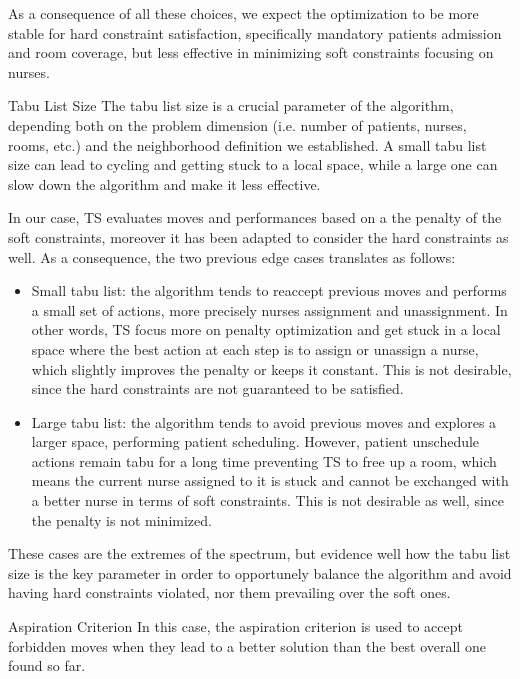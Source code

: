 \begin{section}
\begin{subsection}
     As a consequence of all these choices, we expect the optimization to be more stable for hard constraint satisfaction, specifically mandatory patients admission
     and room coverage, but less effective in minimizing soft constraints focusing on nurses.


 \end{subsection}

 \begin{subsection}
     {Tabu List Size}
     The tabu list size is a crucial parameter of the algorithm, depending
     both on the problem dimension (i.e. number of patients, nurses, rooms, etc.) and the neighborhood definition we established.
     A small tabu list size can lead to cycling and getting stuck to a local space, while a large one can
     slow down the algorithm and make it less effective.

     In our case, TS evaluates moves and performances based on a
     the penalty of the soft constraints, moreover it has been adapted to consider
     the hard constraints as well. As a consequence,
     the two previous edge cases translates as follows:
     \begin{itemize}
         \item Small tabu list: the algorithm tends to reaccept previous moves and
               performs a small set of actions, more precisely nurses assignment and unassignment.
               In other words, TS focus more on penalty optimization and get stuck in a local space where
               the best action at each step is to assign or unassign a nurse, which slightly improves the penalty
               or keeps it constant. This is not desirable, since the hard constraints are not guaranteed to be satisfied.
         \item Large tabu list: the algorithm tends to avoid previous moves and explores a larger space,
               performing patient scheduling. However, patient unschedule
               actions remain tabu for a long time preventing TS to free up a room, which means
               the current nurse assigned to it is stuck and cannot be exchanged with a
               better nurse in terms of soft constraints.
               This is not desirable as well, since the penalty is not minimized.

     \end{itemize}
     These cases are the extremes of the spectrum,
     but evidence well how the tabu list size is the key parameter in order to
     opportunely balance the algorithm and avoid having
     hard constraints violated, nor them prevailing over the soft ones.


 \end{subsection}

 \begin{subsection}
     {Aspiration Criterion}
     In this case, the aspiration criterion is used to accept forbidden moves when they lead to
     a better solution than the best overall one found so far.


 \end{subsection}
\end{section}